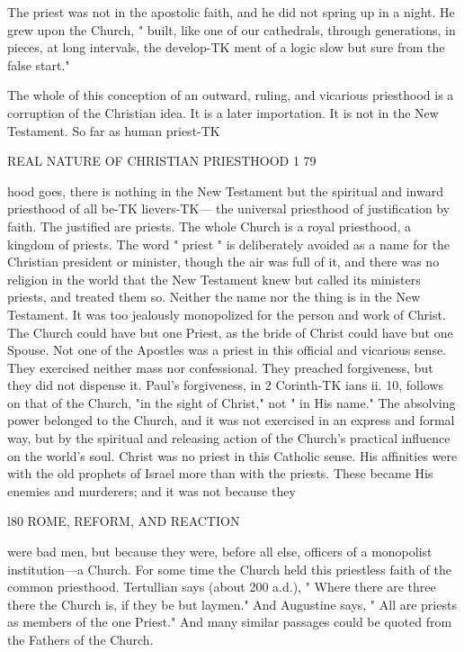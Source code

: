 \documentclass[12pt,a5paper,oneside]{book}
\begin{document}
{The priest was not in the apostolic faith, and he 
did not spring up in a night. He grew upon the 
Church, " built, like one of our cathedrals, through 
generations, in pieces, at long intervals, the develop-TK
ment of a logic slow but sure from the false start." 

The whole of this conception of an outward, 
ruling, and vicarious priesthood is a corruption of 
the Christian idea. It is a later importation. It is 
not in the New Testament. So far as human priest-TK



REAL NATURE OF CHRISTIAN PRIESTHOOD 1 79 

hood goes, there is nothing in the New Testament 
but the spiritual and inward priesthood of all be-TK
lievers-TK— the universal priesthood of justification by 
faith. The justified are priests. The whole Church 
is a royal priesthood, a kingdom of priests. The word 
" priest " is deliberately avoided as a name for the 
Christian president or minister, though the air was 
full of it, and there was no religion in the world that 
the New Testament knew but called its ministers 
priests, and treated them so. Neither the name nor 
the thing is in the New Testament. It was too 
jealously monopolized for the person and work of 
Christ. The Church could have but one Priest, 
as the bride of Christ could have but one Spouse. 
Not one of the Apostles was a priest in this official 
and vicarious sense. They exercised neither mass nor 
confessional. They preached forgiveness, but they 
did not dispense it. Paul's forgiveness, in 2 Corinth-TK
ians ii. 10, follows on that of the Church, "in the 
sight of Christ," not " in His name." The absolving 
power belonged to the Church, and it was not exercised 
in an express and formal way, but by the spiritual and 
releasing action of the Church's practical influence on 
the world's soul. Christ was no priest in this Catholic 
sense. His affinities were with the old prophets of 
Israel more than with the priests. These became His 
enemies and murderers; and it was not because they 



l80 ROME, REFORM, AND REACTION 

were bad men, but because they were, before all else, 
officers of a monopolist institution---a Church. For 
some time the Church held this priestless faith of the 
common priesthood. Tertullian says (about 200 a.d.), 
" Where there are three there the Church is, if they 
be but laymen." And Augustine says, " All are 
priests as members of the one Priest." And many 
similar passages could be quoted from the Fathers of 
the Church. 

}
\end{document}

